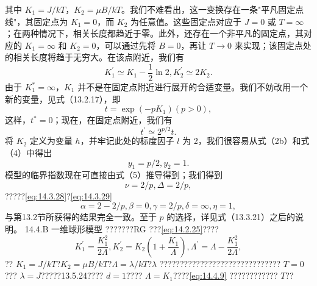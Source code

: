 其中 \(K_{1}=J/kT\)，\(K_{2}=\mu B/kT\)。我们不难看出，这一变换存在一条"平凡固定点线"，其固定点为 \(K_{1}=0\)，而 \(K_{2}\) 为任意值。这些固定点对应于 \(J=0\) 或 \(T=\infty\)；在两种情况下，相关长度都趋近于零。此外，还存在一个非平凡的固定点，其对应的 \(K_{1}=\infty\) 和 \(K_{2}=0\)，可以通过先将 \(B=0\)，再让 \(T\rightarrow0\) 来实现；该固定点处的相关长度将趋于无穷大。在该点附近，我们有
\begin{equation}\tag{14.4.3}\label{eq:14.4.3}
K _ { 1 } ^{\prime} \simeq K _ { 1 } - \frac { 1 } { 2 } \ln 2 ,  K _ { 2 } ^{\prime} \simeq 2 K _ { 2 } .
\end{equation}
由于 \(K_{1}^{*}=\infty\)，\(K_{1}\) 并不是在固定点附近进行展开的合适变量。我们不妨改用一个新的变量，见式（13.2.17），即
\begin{equation}\tag{14.4.4}\label{eq:14.4.4}
t = \exp ( - p K _ { 1 } )  ( p > 0 ) ,
\end{equation}
这样，\(t^{*}=0\)；现在，在固定点附近，我们有
\begin{equation}\tag{14.4.5}\label{eq:14.4.5}
t ^{\prime} \simeq 2 ^{p / 2} t .
\end{equation}
将 \(K_{2}\) 定义为变量 \(h\)，并牢记此处的标度因子 \(l\) 为 2，我们很容易从式（2b）和式（4）中得出
\begin{equation}\tag{14.4.6}\label{eq:14.4.6}
y _ { 1 } = p / 2 ,  y _ { 2 } = 1 .
\end{equation}
模型的临界指数现在可直接由式（5）推导得到；我们得到
\begin{equation}\tag{14.4.7}\label{eq:14.4.7}
\nu = 2 / p ,  \Delta = 2 / p ,
\end{equation}
?????\autoref{eq:14.3.28}?\autoref{eq:14.3.29}
\begin{equation}\tag{14.4.8}\label{eq:14.4.8}
\alpha = 2 - 2 / p ,  \beta = 0 ,  \gamma = 2 / p ,  \delta = \infty ,  \eta = 1 ,
\end{equation}
与第13.2节所获得的结果完全一致。至于 \(p\) 的选择，详见式（13.3.21）之后的说明。
14.4.B 一维球形模型
???????RG ???\autoref{eq:14.2.25}????
\begin{equation}\tag{14.4.9}\label{eq:14.4.9}
K _ { 1 } ^{\prime} = \frac { K _ { 1 } ^{2} } { 2 \Lambda } ,  K _ { 2 } ^{\prime} = K _ { 2 } \left( 1 + \frac { K _ { 1 } } { \Lambda } \right) ,  \Lambda ^{\prime} = \Lambda - \frac { K _ { 1 } ^{2} } { 2 \Lambda } ,
\end{equation}
?? \(K_{1}=J/kT\)?\(K_{2}=\mu B/kT\)?\(\Lambda=\lambda/kT\)?\(\lambda\) ?????????????????????????????? \(T=0\)??? \(\lambda=J\)?????13.5.24???? \(d=1\)???? \(\Lambda=K_{1}\)????\autoref{eq:14.4.9} ???????????? \(T\)??
